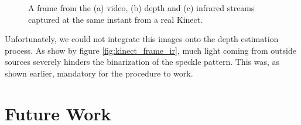 \documentclass[journal]{IEEEtran}
\begin{document}
\begin{figure}[!t]
    \centering
        \hfil
        \hfil
    \caption{A frame from the (a) video, (b) depth and (c) infrared streams captured at the same instant from a real Kinect.}
    \label{fig:kinect_frame}
\end{figure}

Unfortunately, we could not integrate this images onto the depth estimation process. As show by figure \ref{fig:kinect_frame_ir}, much light coming from outside sources severely hinders the binarization of the speckle pattern. This was, as shown earlier, mandatory for the procedure to work.

\section{Future Work}
\end{document}
